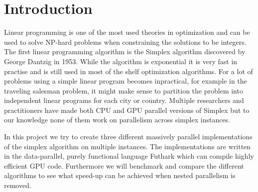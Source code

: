 \section{Introduction}
Linear programming is one of the most used theories in optimization and can be used to solve NP-hard problems when constraining the solutions to be integers. The first linear programming algorithm is the Simplex algorithm discovered by George Dantzig in 1953. While the algorithm is exponential it is very fast in practise and is still used in most of the shelf optimization algorithms. For a lot of problems using a simple linear program becomes inpractical, for example in the traveling salesman problem, it might make sense to partition the problem into independent linear programs for each city or country. Multiple researchers and practitioners have made both CPU and GPU parallel versions of Simplex but to our knowledge none of them work on parallelism across simplex instances.

In this project we try to create three different massively parallel implementations of the simplex algorithm on multiple instances. The implementations are written in the data-parallel, purely functional language Futhark which can compile highly efficient GPU code. Furthermore we will benchmark and compare the different algorithms to see what speed-up can be achieved when nested parallelism is removed. 
